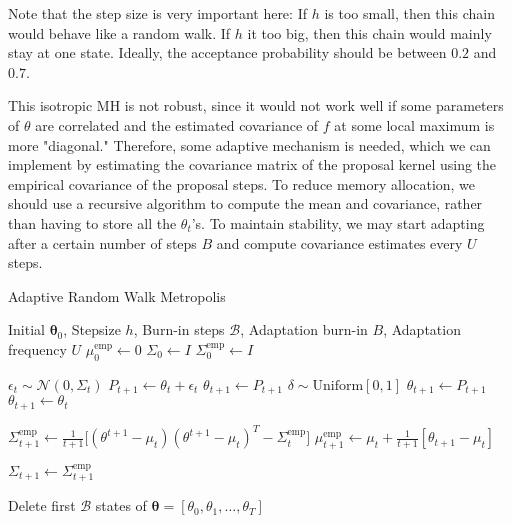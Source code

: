     Note that the step size is very important here: If $h$ is too small, then this chain would behave like a random walk. If $h$ it too big, then this chain would mainly stay at one state. Ideally, the acceptance probability should be between $0.2$ and $0.7$. 

    This isotropic MH is not robust, since it would not work well if some parameters of $\theta$ are correlated and the estimated covariance of $f$ at some local maximum is more "diagonal." Therefore, some adaptive mechanism is needed, which we can implement by estimating the covariance matrix of the proposal kernel using the empirical covariance of the proposal steps. To reduce memory allocation, we should use a recursive algorithm to compute the mean and covariance, rather than having to store all the $\theta_t$'s. To maintain stability, we may start adapting after a certain number of steps $B$ and compute covariance estimates every $U$ steps. 

    \begin{algorithm}
      \caption{Adaptive Random Walk Metropolis}\label{alg:adaptive_metro}
      \begin{algorithmic}

      \Require Initial $\boldsymbol{\theta}_0$, Stepsize $h$, Burn-in steps $\mathcal{B}$, Adaptation burn-in $B$, Adaptation frequency $U$
      \State $\mu_0^\mathrm{emp} \gets 0$ 
      \State $\Sigma_0 \gets I$
      \State $\Sigma^\mathrm{emp}_0 \gets I$

          \State $\epsilon_t \sim \mathcal{N}(0, \Sigma_t)$ 
          \State $P_{t+1} \gets \theta_t + \epsilon_t$
              \State $\theta_{t+1} \gets P_{t+1}$ 
          \Else
              \State $\delta \sim \mathrm{Uniform}[0, 1]$
                  \State $\theta_{t+1} \gets P_{t+1}$ 
              \Else 
                  \State $\theta_{t+1} \gets \theta_t$
              \EndIf
          \EndIf
          
          \State $\Sigma^\mathrm{emp}_{t+1} \gets \frac{1}{t+1} \big[(\theta^{t+1} - \mu_t) (\theta^{t+1} - \mu_t)^T - \Sigma^\mathrm{emp}_t \big]$
          \State $\mu_{t+1}^{\mathrm{emp}} \gets \mu_t + \frac{1}{t+1} [ \theta_{t+1} - \mu_t ]$
          
              \State $\Sigma_{t+1} \gets \Sigma^\mathrm{emp}_{t+1}$
          \EndIf
      \EndFor

      \State Delete first $\mathcal{B}$ states of $\boldsymbol{\theta} = [\theta_0, \theta_1, \ldots, \theta_T]$

      \end{algorithmic}
    \end{algorithm}


